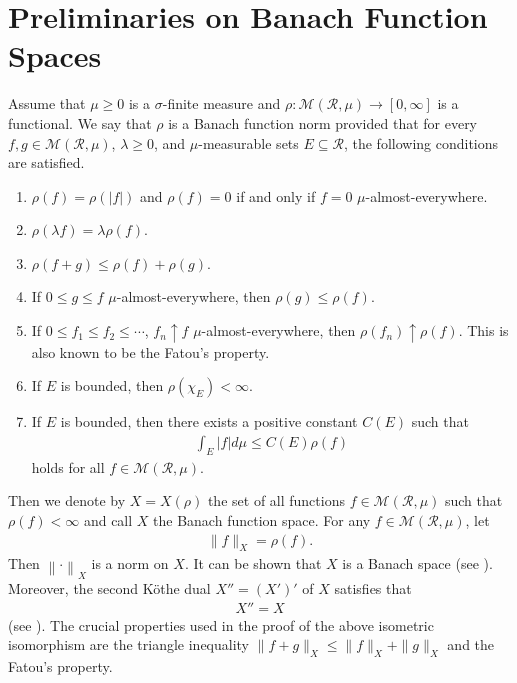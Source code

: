 \documentclass[10pt,reqno]{amsart}
\numberwithin{equation}{section}
\begin{document}
\section{Preliminaries on Banach Function Spaces}
Assume that $\mu\geq 0$ is a $\sigma$-finite measure and $\rho:\mathcal{M}(\mathcal{R},\mu)\rightarrow[0,\infty]$ is a functional. We say that $\rho$ is a Banach function norm provided that for every $f,g\in\mathcal{M}(\mathcal{R},\mu)$, $\lambda\geq 0$, and $\mu$-measurable sets $E\subseteq\mathcal{R}$, the following conditions are satisfied. 
\begin{enumerate}
\item $\rho(f)=\rho(|f|)$ and $\rho(f)=0$ if and only if $f=0$ $\mu$-almost-everywhere.

\medskip
\item $\rho(\lambda f)=\lambda\rho(f)$.

\medskip
\item $\rho(f+g)\leq\rho(f)+\rho(g)$.

\medskip
\item If $0\leq g\leq f$ $\mu$-almost-everywhere, then $\rho(g)\leq\rho(f)$.

\medskip
\item If $0\leq f_{1}\leq f_{2}\leq\cdots$, $f_{n}\uparrow f$ $\mu$-almost-everywhere, then $\rho(f_{n})\uparrow\rho(f)$. This is also known to be the Fatou's property.

\medskip
\item If $E$ is bounded, then $\rho(\chi_{E})<\infty$.

\medskip
\item If $E$ is bounded, then there exists a positive constant $C(E)$ such that 
\begin{align*}
\int_{E}|f|d\mu\leq C(E)\rho(f)
\end{align*}
holds for all $f\in\mathcal{M}(\mathcal{R},\mu)$.
\end{enumerate}
Then we denote by $X=X(\rho)$ the set of all functions $f\in\mathcal{M}(\mathcal{R},\mu)$ such that $\rho(f)<\infty$ and call $X$ the Banach function space. For any $f\in\mathcal{M}(\mathcal{R},\mu)$, let
\begin{align*}
\|f\|_{X}=\rho(f).
\end{align*}
Then $\left\|\cdot\right\|_{X}$ is a norm on $X$. It can be shown that $X$ is a Banach space (see \cite[Corollary 6.1.15]{PKJF}). Moreover, the second K\"othe dual $X''=(X')'$ of $X$ satisfies that
\begin{align*}
X''=X
\end{align*}
(see \cite[Theorem 6.2.9]{PKJF}). The crucial properties used in the proof of the above isometric isomorphism are the triangle inequality $\|f+g\|_{X}\leq\|f\|_{X}+\|g\|_{X}$ and the Fatou's property.
\end{document}
